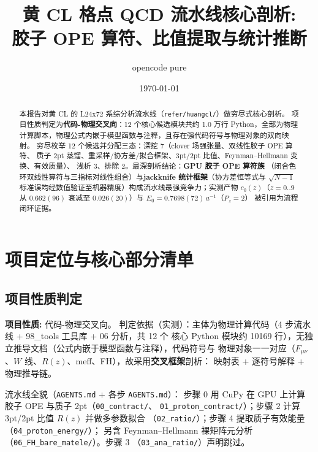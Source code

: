 \documentclass[UTF8]{ctexart}
\title{黄 CL 格点 QCD 流水线核心剖析:\\ 胶子 OPE 算符、比值提取与统计推断}
\author{opencode pure}
\date{\today}
\begin{document}
\maketitle

\begin{abstract}
本报告对黄 CL 的 L24x72 系综分析流水线（\texttt{\nolinkurl{refer/huangcl/}}）做穷尽式核心剖析。
项目性质判定为\textbf{代码-物理交叉向}：12 个核心候选模块共约 1.0 万行 Python，全部为物理
计算脚本，物理公式内嵌于模型函数与注释，且存在强代码符号与物理对象的双向映射。
穷尽枚举 12 个候选并分配三态：\textcolor{phys}{深挖 7}（clover 场强张量、双线性胶子 OPE 算符、
质子 2pt 蒸馏、重采样/协方差/拟合框架、3pt/2pt 比值、Feynman--Hellmann 变换、有效质量）、
\textcolor{phys}{浅析 3}、\textcolor{phys}{排除 2}。最深剖析结论：\textbf{GPU 胶子 OPE 算符族}
（闭合色环双线性算符与三指标对线性组合）与\textbf{jackknife 统计框架}（协方差恒等式与
$\sqrt{N-1}$ 标准误均经数值验证至机器精度）构成流水线最强竞争力；实测产物
$c_0(z)$（$z=0..9$ 从 $0.662(96)$ 衰减至 $0.026(20)$）与 $E_0=0.7698(72)\,a^{-1}$（$P_z=2$）
被引用为流程闭环证据。
\end{abstract}

\tableofcontents

\section{项目定位与核心部分清单}

\subsection{项目性质判定}

\begin{keybox}
\textbf{项目性质:} \textcolor{phys}{代码-物理交叉向}。
判定依据（实测）：主体为物理计算代码（4 步流水线 + 98\_tools 工具库 + 06 分析，共 12 个
核心 Python 模块约 10169 行），无独立推导文档（公式内嵌于模型函数与注释），代码符号与
物理对象一一对应（$F_{\mu\nu}$、$W$ 线、$R(z)$、meff、FH），故采用\textbf{交叉框架}剖析：
映射表 + 逐符号解释 + 物理推导链。
\end{keybox}

流水线全貌（\texttt{\nolinkurl{AGENTS.md}} + 各步 \texttt{\nolinkurl{AGENTS.md}}）：
步骤 0 用 CuPy 在 GPU 上计算胶子 OPE 与质子 2pt（\texttt{\nolinkurl{00_contract/}}、
\texttt{\nolinkurl{01_proton_contract/}}）；步骤 2 计算 3pt/2pt 比值 $R(z)$ 并做多参数拟合
（\texttt{\nolinkurl{02_ratio/}}）；步骤 4 提取质子有效能量（\texttt{\nolinkurl{04_proton_energy/}}）；
另含 Feynman--Hellmann 裸矩阵元分析（\texttt{\nolinkurl{06_FH_bare_matele/}}）。步骤 3
（\texttt{\nolinkurl{03_ana_ratio/}}）声明跳过。
\end{document}
